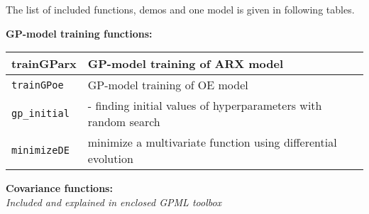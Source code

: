 \documentclass[12pt,twoside]{article}
\newcommand{\fun}[1]{\tt #1}
\begin{document}
\clearpage

 The list of included functions, demos and one model is given in
 following tables.


{\renewcommand{\arraystretch}{1.1}

\pagebreak[0]
\textbf{GP-model training functions:} \\
\begin{tabular}{|l|l|}
 \hline trainGParx & GP-model training of ARX model \\
 \hline \fun{trainGPoe} & GP-model training of OE model \\
 \hline \fun{gp\_initial} & - finding initial values of hyperparameters with random search  \\
  \hline \fun{minimizeDE} & minimize a multivariate function using differential evolution \\
  \hline
\end{tabular}

\pagebreak[0]
\textbf{Covariance functions:} \\
{\it Included and explained in enclosed GPML toolbox}

}
\end{document}
